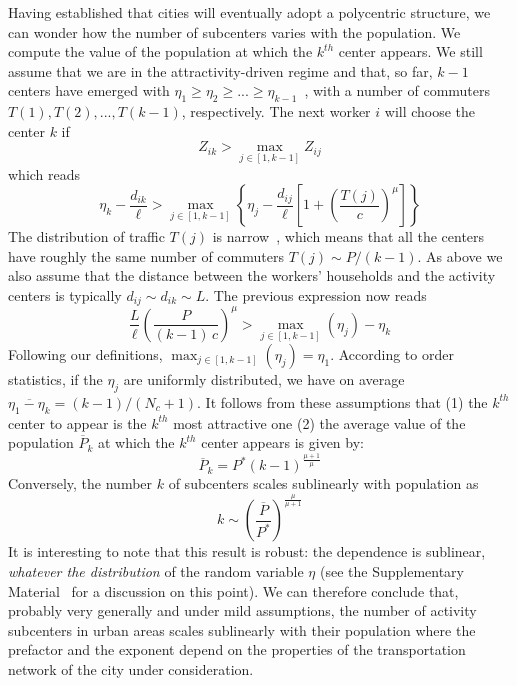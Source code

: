 Having established that cities will eventually adopt a polycentric
structure, we can wonder how the number of subcenters varies with the
population. We compute the value of the population at which 
the $k^{th}$ center appears. We still assume that we are in the attractivity-driven regime and that, so far, $k-1$
centers have emerged with $\eta_{1} \geq \eta_{2} \geq ... \geq
\eta_{k-1}$~\cite{SM}, with a number of commuters $T(1), T(2), ...,
T(k-1)$, respectively. The next worker $i$ will choose the center $k$ if
\begin{equation}
Z_{ik} > \max_{j \in \left[1,k-1\right]} Z_{ij}
\end{equation}
which reads
\begin{equation}
\eta_k - \frac{d_{ik}}{\ell} > \max_{j \in \left[1,k-1\right]} \left\{
\eta_j - \frac{d_{ij}}{\ell} \left[ 1 + \left(
  \frac{T(j)}{c}\right)^\mu\right] \right\}
\end{equation}
The distribution of traffic $T(j)$ is narrow~\cite{SM}, which means that all the centers have roughly the same number of
commuters $T(j) \sim P/(k-1)$. As above we also assume that the
distance between the workers' households and the activity centers is
typically $d_{ij} \sim d_{ik} \sim L$. The previous expression now
reads
\begin{equation}
\frac{L}{\ell} \left( \frac{P}{(k-1)\,c} \right)^{\mu} > \max_{j \in
  \left[1,k-1\right]} \left( \eta_j \right) - \eta_k
\end{equation}
Following our definitions, $\max_{j \in \left[1,k-1\right]} \left(
\eta_j \right) = \eta_1$. According to order statistics, if the
$\eta_j$ are uniformly distributed, we have on average
$\overline{\eta_1 - \eta_k} = (k-1)/(N_c+1)$. It follows from these
assumptions that (1) the $k^{th}$ center to appear is the $k^{th}$ most attractive one (2) the average value of the population $\overline{P}_k$ at
which the $k^{th}$ center appears is given by:
%
\begin{equation}
\overline{P}_k = P^* \left( k-1 \right)^{\frac{\mu+1}{\mu}}
\label{eq:prediction}
\end{equation}
%
Conversely, the number $k$ of subcenters scales sublinearly with population as
\begin{equation}
k \sim \left( \frac{\overline{P}}{P^*} \right)^{\frac{\mu}{\mu + 1}}
\end{equation}
It is interesting to note that this result is robust: the dependence
is sublinear, \emph{whatever the distribution} of the random variable
$\eta$ (see the Supplementary Material~\cite{SM} for a discussion on this
point). We can therefore conclude that, probably very generally and
under mild assumptions, the number of activity subcenters in urban
areas scales sublinearly with their population where the prefactor and
the exponent depend on the properties of the transportation network of
the city under consideration. 

